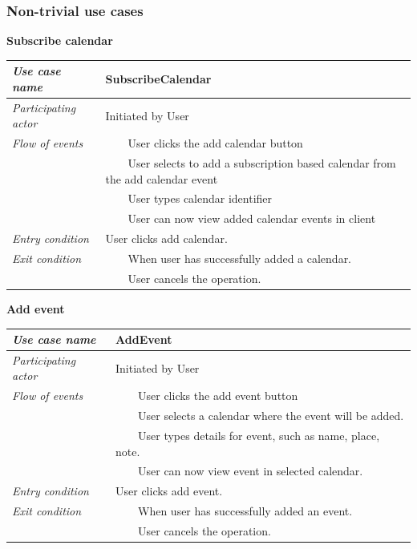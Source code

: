 \documentclass[10pt]{report}
\newcommand{\tabitem}{~~\llap{\textbullet}~~}
\numberwithin{equation}{section} %
\numberwithin{figure}{section} %
\numberwithin{table}{section} %
\begin{document}
\subsubsection{Non-trivial use cases}
\begin{table}[H]
\noindent \textbf{Subscribe calendar}\\
\begin{tabularx}{\textwidth}{l X}
\midrule
\textit{Use case name} & SubscribeCalendar \\ \midrule
\textit{Participating actor} & Initiated by User \\ \midrule
\textit{Flow of events} & \tabitem User clicks the add calendar button\\
                                       & \tabitem User selects to add a
                                       subscription based calendar from the add
                                       calendar event\\
                                       & \tabitem User types calendar identifier \\
                                       & \tabitem User can now view added calendar events
                                       in client\\
                        \midrule
\textit{Entry condition} & User clicks add calendar.\\ \midrule
\textit{Exit condition} & \tabitem When user has successfully added a calendar. \\
						& \tabitem User cancels the operation.\\
                        \midrule
\end{tabularx}
\end{table}

\begin{table}[H]
\noindent \textbf{Add event}\\
\begin{tabularx}{\textwidth}{l X}
\midrule
\textit{Use case name} & AddEvent \\ \midrule
\textit{Participating actor} & Initiated by User \\ \midrule
\textit{Flow of events} & \tabitem User clicks the add event button\\
                                       & \tabitem User selects a calendar where
                                       the event will be added.\\
                                       & \tabitem User types details for event, such as
                                       name, place, note.\\
                                       & \tabitem User can now view event in selected calendar.\\
                        \midrule
\textit{Entry condition} & User clicks add event.\\ \midrule
\textit{Exit condition} & \tabitem When user has successfully added  an event. \\
						& \tabitem User cancels the operation.\\
                        \midrule
\end{tabularx}
\end{table}
\end{document}
